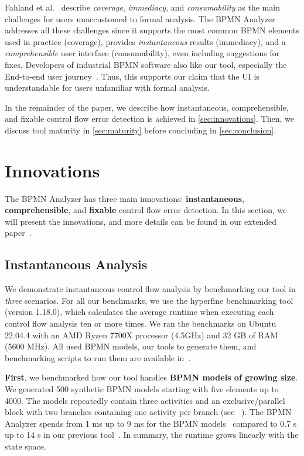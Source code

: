 \documentclass[onecolumn]{ceurart}
\begin{document}
Fahland et al.~\cite{fahlandAnalysisDemandInstantaneous2011} describe \textit{coverage}, \textit{immediacy}, and \textit{consumability} as the main challenges for users unaccustomed to formal analysis.
The BPMN Analyzer addresses all these challenges since it supports the most common BPMN elements used in practice (coverage), provides \textit{instantaneous} results (immediacy), and a \textit{comprehensible} user interface (consumability), even including suggestions for fixes.
Developers of industrial BPMN software also like our tool, especially the End-to-end user journey~\cite{krauterInstantaneousComprehensibleFixable2024}.
Thus, this supports our claim that the UI is understandable for users unfamiliar with formal analysis.

In the remainder of the paper, we describe how instantaneous, comprehensible, and fixable control flow error detection is achieved in \autoref{sec:innovations}.
Then, we discuss tool maturity in \autoref{sec:maturity} before concluding in \autoref{sec:conclusion}.

\section{Innovations} \label{sec:innovations} %
The BPMN Analyzer has three main innovations: \textbf{instantaneous}, \textbf{comprehensible}, and \textbf{fixable} control flow error detection.
In this section, we will present the innovations, and more details can be found in our extended paper~\cite{krauterInstantaneousComprehensibleFixable2024}.

\subsection{Instantaneous Analysis}

We demonstrate instantaneous control flow analysis by benchmarking our tool in \textit{three} scenarios.
For all our benchmarks, we use the hyperfine benchmarking tool (version 1.18.0), which calculates the average runtime when executing each control flow analysis ten or more times.
We ran the benchmarks on Ubuntu 22.04.4 with an AMD Ryzen 7700X processor (4.5GHz) and 32 GB of RAM (5600 MHz).
All used BPMN models, our tools to generate them, and benchmarking scripts to run them are available in~\cite{krauterInstantaneousComprehensibleFixable2024}.

\textbf{First}, we benchmarked how our tool handles \textbf{BPMN models of growing size}.
We generated 500 synthetic BPMN models starting with five elements up to 4000.
The models repeatedly contain three activities and an exclusive/parallel block with two branches containing one activity per branch (see ~\cite{krauterInstantaneousComprehensibleFixable2024}).
The BPMN Analyzer spends from 1 ms up to 9 ms for the BPMN models~\cite{krauterInstantaneousComprehensibleFixable2024} compared to 0.7 s up to 14 s in our previous tool~\cite{krauterHigherorderTransformationApproach2024}.
In summary, the runtime grows linearly with the state space.
\end{document}
